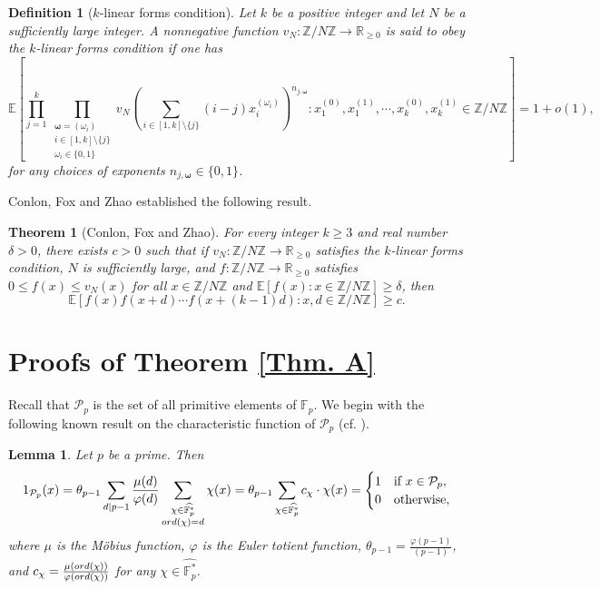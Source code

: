 \documentclass[10pt,a4paper]{amsart}
\def\ord{{\rm ord}}
\newtheorem{theorem}{Theorem}[section]
\newtheorem{lemma}{Lemma}
\newtheorem{definition}{Definition}
\begin{document}
	\begin{definition}[$k$-linear forms condition]\label{Def. linear forms condition}
		Let $k$ be a positive integer and let $N$ be a sufficiently large integer. A nonnegative function $v_N: \mathbb{Z}/N\mathbb{Z}\rightarrow\mathbb{R}_{\ge 0}$ is said to obey the $k$-linear forms condition if one has 
		$$\mathbb{E}\left[\prod_{j=1}^{k}\prod_{\substack{{\bm \omega}=(\omega_i)\\ i\in[1,k]\setminus\{j\} \\ \omega_i\in \{0,1\}}}v_N\left(\sum_{i\in[1,k]\setminus\{j\}}(i-j)x_i^{(\omega_i)}\right)^{n_{j,{\bm \omega}}}: x_1^{(0)},x_1^{(1)},\cdots, x_k^{(0)},x_k^{(1)}\in\mathbb{Z}/N\mathbb{Z}\right]=1+o(1),$$
		for any choices of exponents $n_{j,{\bm \omega}}\in\{0,1\}$. 
	\end{definition}
	
	Conlon, Fox and Zhao \cite[Theorem 2.4]{CFZ} established the following result. 
	
	\begin{theorem}[Conlon, Fox and Zhao]\label{Thm. CFZ}
		For every integer $k\ge3$ and real number $\delta>0$, there exists $c>0$ such that if $v_N: \mathbb{Z}/N\mathbb{Z}\rightarrow\mathbb{R}_{\ge 0}$ satisfies the $k$-linear forms condition, $N$ is sufficiently large, and $f: \mathbb{Z}/N\mathbb{Z}\rightarrow\mathbb{R}_{\ge 0}$ satisfies $0\le f(x)\le v_N(x)$ for all $x\in \mathbb{Z}/N\mathbb{Z}$ and $\mathbb{E}[f(x): x\in \mathbb{Z}/N\mathbb{Z}]\ge \delta$, then 
		$$\mathbb{E}\left[f(x)f(x+d)\cdots f(x+(k-1)d): x, d\in\mathbb{Z}/N\mathbb{Z}\right]\ge c.$$
	\end{theorem}
	
	
	
	
	
	\section{Proofs of Theorem \ref{Thm. A}}
	\setcounter{lemma}{0}
	\setcounter{theorem}{0}
	\setcounter{equation}{0}
	\setcounter{conjecture}{0}
	\setcounter{remark}{0}
	\setcounter{corollary}{0}
	
	Recall that $\mathcal{P}_p$ is the set of all primitive elements of $\mathbb{F}_p$. We begin with the following known result on the characteristic function of $\mathcal{P}_p$ (cf. \cite{Cohen15,Cohen21}).
	
	\begin{lemma}\label{Lem. characteristic function of P}
		Let $p$ be a prime. Then 
		$$1_{\mathcal{P}_p}(x)=\theta_{p-1}\sum_{d\mid p-1}\frac{\mu(d)}{\varphi(d)}\sum_{\substack{\chi\in\widehat{\mathbb{F}_p^*} \\ \ord(\chi)=d}} \chi(x)=\theta_{p-1}\sum_{\chi\in\widehat{\mathbb{F}_p^*}}c_{\chi}\cdot \chi(x)
		=\begin{cases}
			1  & \mbox{if}\ x\in\mathcal{P}_p,\\
			0 & \mbox{otherwise},
		\end{cases}$$
		where $\mu$ is the M\"obius function, $\varphi$ is the Euler totient function, $\theta_{p-1}=\frac{\varphi(p-1)}{(p-1)}$, and $c_{\chi}=\frac{\mu(\ord(\chi))}{\varphi(\ord(\chi))}$ for any $\chi\in\widehat{\mathbb{F}_p^*}$. 
	\end{lemma}
	
\end{document}
